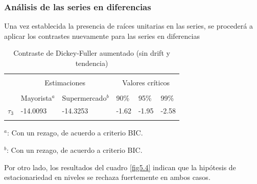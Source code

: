 \documentclass[12pt, twoside]{book}\usepackage[]{graphicx}\usepackage[]{color}
\numberwithin{equation}{section}
\numberwithin{theorem}{section}
\numberwithin{teorema}{section}
\numberwithin{defi}{section}
\numberwithin{prop}{section}
\numberwithin{defi}{section}
\theoremstyle{plain}
\begin{document}
\subsubsection{Análisis de las series en diferencias}

Una vez establecida la presencia de raíces unitarias en las series, se procederá a aplicar los contrastes nuevamente para las series en diferencias




\begin{center}
\begin{table}[!htpb]
\caption{Contraste de Dickey-Fuller aumentado (sin drift y tendencia)\label{tab:dickey1}}
\centering
\begin{threeparttable}
\begin{tabular}{@{}llllll@{}}
\toprule \\
\multicolumn{1}{l}{} & \multicolumn{2}{c}{Estimaciones} &
\multicolumn{3}{c}{Valores críticos} \\
\cmidrule(l){2-3} \cmidrule(l){4-6} \\
\multicolumn{1}{l}{} & \multicolumn{1}{c}{Mayorista$^{a}$} &
 \multicolumn{1}{c}{Supermercado$^{b}$} &
\multicolumn{1}{l}{90\%}&
\multicolumn{1}{l}{95\%}&
\multicolumn{1}{l}{99\%}
\\
\midrule
$\tau_{3} $  &  -14.0093 &  -14.3253  & -1.62 & -1.95 & -2.58 \\
\bottomrule \\
\end{tabular}
\begin{tablenotes}
\small 
\item $^{a}$: Con un rezago, de acuerdo a criterio BIC. 
\item $^{b}$: Con un rezago, de acuerdo a criterio BIC. 
\end{tablenotes}
\end{threeparttable}
\end{table}
\end{center}



Por otro lado, los resultados del cuadro \ref{fig5.4} indican que la hipótesis de estacionariedad en niveles se rechaza fuertemente en ambos casos. 
\end{document}
